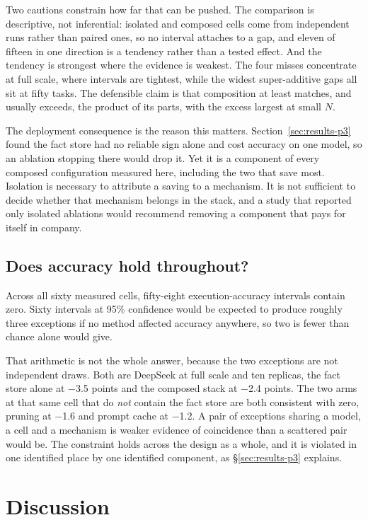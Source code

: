 \documentclass[conference]{IEEEtran}
\begin{document}
Two cautions constrain how far that can be pushed. The comparison is
descriptive, not inferential:
isolated and composed cells come from independent runs rather than paired ones,
so no interval attaches to a gap, and eleven of fifteen in one direction is a
tendency rather than a tested effect. And the tendency is strongest where the
evidence is weakest. The four misses concentrate at full scale, where intervals
are tightest, while the widest super-additive gaps all sit at fifty tasks. The defensible claim is that composition at least matches, and usually
exceeds, the product of its parts, with the excess largest at small $N$.

The deployment consequence is the reason this matters.
Section~\ref{sec:results-p3} found the fact store had no reliable sign alone and
cost accuracy on one model, so an ablation stopping there would drop it. Yet it is
a component of every composed configuration measured here, including the two
that save most. Isolation is necessary to attribute a saving to a mechanism. It
is not sufficient to decide whether that mechanism belongs in the stack, and a
study that reported only isolated ablations would recommend removing a component
that pays for itself in company.

\subsection{Does accuracy hold throughout?}\label{sec:results-ex}

Across all sixty measured cells, fifty-eight execution-accuracy intervals
contain zero. Sixty intervals at 95\% confidence would be expected to
produce roughly three exceptions if no method affected accuracy anywhere, so two
is fewer than chance alone would give.

That arithmetic is not the whole answer, because the two exceptions are not
independent draws. Both are DeepSeek at full scale and ten replicas, the fact
store alone at $-$3.5 points and the composed stack at $-$2.4 points. The two
arms at that same cell that do \emph{not} contain the fact store are both
consistent with zero, pruning at $-$1.6 and prompt cache at $-$1.2. A pair of exceptions
sharing a model, a cell and a mechanism is weaker evidence of coincidence than a
scattered pair would be. The constraint holds across the design as a whole,
and it is violated in one identified place by one identified component, as
§\ref{sec:results-p3} explains.

\section{Discussion}\label{sec:discussion}
\end{document}
